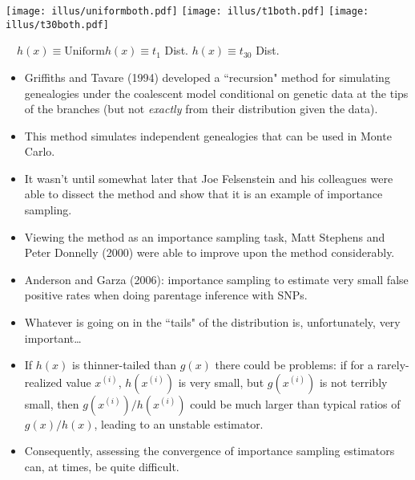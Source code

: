 \begin{center}
		\texttt{[image: illus/uniformboth.pdf]} \hfill
\texttt{[image: illus/t1both.pdf]}\hfill
\texttt{[image: illus/t30both.pdf]}
\end{center}
~~$h(x)\equiv\mathrm{Uniform}$\hfill $h(x)\equiv t_1$ Dist. \hfill $h(x)\equiv t_{30}$ Dist.~~~~

\begin{itemize}
\item Griffiths and Tavare (1994) developed a ``recursion" method for simulating genealogies under the coalescent model conditional on genetic data at the tips of the branches (but not {\em exactly} from their distribution given the data).

\item This method simulates independent genealogies that can be used in Monte Carlo. 

\item It wasn't until somewhat later that Joe Felsenstein and his colleagues were able to dissect the method and show that it is an example of importance sampling. 

\item Viewing the method as an importance sampling task, Matt Stephens and Peter Donnelly (2000) were able to improve upon the method considerably.

\item Anderson and Garza (2006): importance sampling to estimate very small false positive rates when doing parentage inference with SNPs.
\end{itemize}


\begin{itemize}
\item Whatever is going on in the ``tails" of the distribution is, unfortunately, very important\ldots
\item If $h(x)$ is thinner-tailed than $g(x)$ there could be problems: if for a rarely-realized value $x^{(i)}$, $h(x^{(i)})$ is very small, but $g(x^{(i)})$ is not terribly small, then $g(x^{(i)})/h(x^{(i)})$ could be much larger than typical ratios of $g(x)/h(x)$, leading to an unstable estimator.

\item Consequently, assessing the convergence of importance sampling estimators can, at times, be quite difficult.

\end{itemize}

